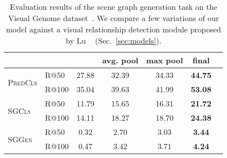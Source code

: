 \documentclass[10pt,twocolumn,letterpaper]{article}
\begin{document}
\begin{table}[!htp]
\small
  \caption{Evaluation results of the scene graph generation task on the Visual Genome
  dataset~\cite{VG}. We compare a few variations of our model against a visual relationship detection module proposed by Lu \etal~\cite{lu2016visual} (Sec.~\ref{sec:models}).}
\vspace*{-10pt}

\begin{center}
  \begin{tabular}{l  l ||  c c c c c  }
    \multicolumn{2}{c}{}                 & ~\cite{lu2016visual} & avg. pool & max pool &final    \\ \hline\hline
    \multirow{2}{*}{\textsc{Pred}\textsc{Cls}}     &R@50  & 27.88    & 32.39    &  34.33     &\textbf{44.75} \\
                                                   &R@100 & 35.04    & 39.63    &  41.99     &\textbf{53.08} \\\hline
    \multirow{2}{*}{\textsc{SG}\textsc{Cls}}       &R@50  & 11.79    & 15.65    &  16.31     &\textbf{21.72} \\
                                                   &R@100 & 14.11    & 18.27    &  18.70     &\textbf{24.38} \\\hline
    \multirow{2}{*}{\textsc{SG}\textsc{Gen}}       &R@50  & 0.32     & 2.70     &  3.03      &\textbf{3.44}  \\
                                                   &R@100 & 0.47     & 3.42     &  3.71      &\textbf{4.24}  \\
    \hline
  \end{tabular}
 \vspace*{-10pt}

\end{center}

\label{table:vg_eval}
\end{table}

    
\end{document}
